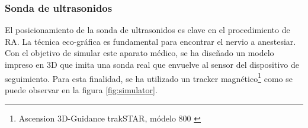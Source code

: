 

\subsubsection{Sonda de ultrasonidos}

El posicionamiento de la sonda de ultrasonidos es clave en el procedimiento de \ac{RA}. La técnica eco-gráfica es fundamental para encontrar el nervio a anestesiar. Con el objetivo de simular este aparato médico, se ha diseñado un modelo impreso en 3D que imita una sonda real que envuelve al sensor del dispositivo de seguimiento. Para esta finalidad, se ha utilizado un \ac{tracker} magnético\footnote{ Ascension 3D-Guidance trakSTAR, módelo 800 \cite{Ascension}} como se puede observar en la figura \ref{fig:simulator}. 


